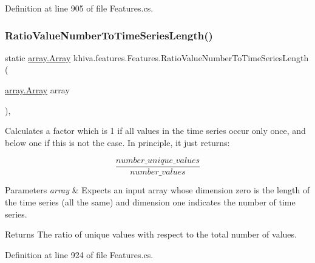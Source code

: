 Definition at line 905 of file Features.\+cs.

\mbox{\label{classkhiva_1_1features_1_1_features_a3d266e683f95b94a05b0846163ded46d}} 
\subsubsection{\texorpdfstring{Ratio\+Value\+Number\+To\+Time\+Series\+Length()}{RatioValueNumberToTimeSeriesLength()}}
{\footnotesize\ttfamily static \mbox{\hyperlink{classkhiva_1_1array_1_1_array}{array.\+Array}} khiva.\+features.\+Features.\+Ratio\+Value\+Number\+To\+Time\+Series\+Length (\begin{DoxyParamCaption}\item[{\mbox{\hyperlink{classkhiva_1_1array_1_1_array}{array.\+Array}}}]{array }\end{DoxyParamCaption})\hspace{0.3cm}{\ttfamily [inline]}, {\ttfamily [static]}}



Calculates a factor which is 1 if all values in the time series occur only once, and below one if this is not the case. In principle, it just returns\+: 

\[ \frac{\textit{number\_unique\_values}}{\textit{number\_values}} \] 


\begin{DoxyParams}{Parameters}
{\em array} & Expects an input array whose dimension zero is the length of the time series (all the same) and dimension one indicates the number of time series.\\
\hline
\end{DoxyParams}
\begin{DoxyReturn}{Returns}
The ratio of unique values with respect to the total number of values.
\end{DoxyReturn}


Definition at line 924 of file Features.\+cs.

\mbox{\label{classkhiva_1_1features_1_1_features_a64710838a714e6a1263bada2c04ad1a1}} 
